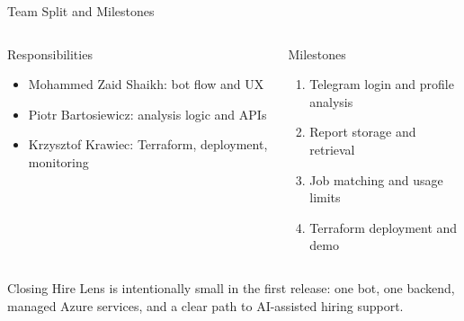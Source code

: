 \documentclass[aspectratio=169]{beamer}
\begin{document}
\begin{frame}{Team Split and Milestones}
\begin{columns}[T,onlytextwidth]
  \begin{block}{Responsibilities}
    \begin{itemize}
      \item Mohammed Zaid Shaikh: bot flow and UX
      \item Piotr Bartosiewicz: analysis logic and APIs
      \item Krzysztof Krawiec: Terraform, deployment, monitoring
    \end{itemize}
  \end{block}
  \begin{block}{Milestones}
    \begin{enumerate}
      \item Telegram login and profile analysis
      \item Report storage and retrieval
      \item Job matching and usage limits
      \item Terraform deployment and demo
    \end{enumerate}
  \end{block}
\end{columns}
\end{frame}

\begin{frame}{Closing}
Hire Lens is intentionally small in the first release: one bot, one backend, managed Azure services, and a clear path to AI-assisted hiring support.
\end{frame}
\end{document}
